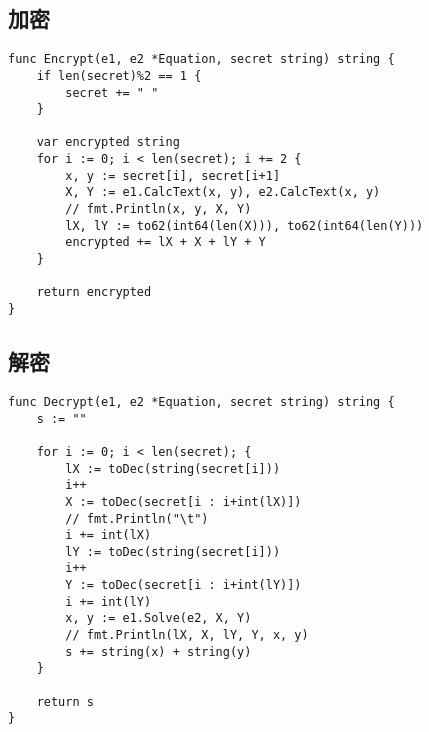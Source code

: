 \documentclass[12pt,a4paper]{article}
\begin{document}
\subsection{加密}
\begin{lstlisting}
func Encrypt(e1, e2 *Equation, secret string) string {
	if len(secret)%2 == 1 {
		secret += " "
	}

	var encrypted string
	for i := 0; i < len(secret); i += 2 {
		x, y := secret[i], secret[i+1]
		X, Y := e1.CalcText(x, y), e2.CalcText(x, y)
		// fmt.Println(x, y, X, Y)
		lX, lY := to62(int64(len(X))), to62(int64(len(Y)))
		encrypted += lX + X + lY + Y
	}

	return encrypted
}
\end{lstlisting}

\subsection{解密}
\begin{lstlisting}
func Decrypt(e1, e2 *Equation, secret string) string {
	s := ""

	for i := 0; i < len(secret); {
		lX := toDec(string(secret[i]))
		i++
		X := toDec(secret[i : i+int(lX)])
		// fmt.Println("\t")
		i += int(lX)
		lY := toDec(string(secret[i]))
		i++
		Y := toDec(secret[i : i+int(lY)])
		i += int(lY)
		x, y := e1.Solve(e2, X, Y)
		// fmt.Println(lX, X, lY, Y, x, y)
		s += string(x) + string(y)
	}

	return s
}
\end{lstlisting}
\end{document}
